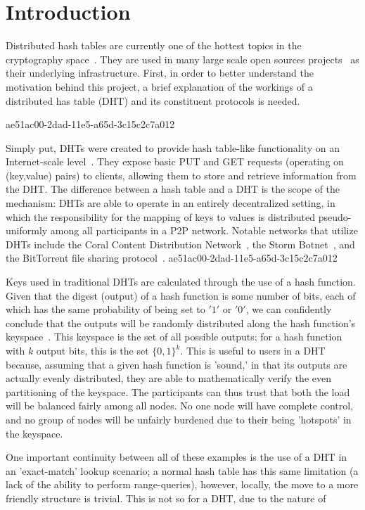 \documentclass[12pt]{article}
\begin{document}
\section{Introduction}
\par Distributed hash tables are currently one of the hottest topics in the cryptography space~\cite{Stoica:2001dj,Rowstron:2001ea,Ratnasamy:2001wn}. They are used in many large scale open sources projects~\cite{Freitas:2013tb,Xu:2010vs,Perfitt:2010fh} as their underlying infrastructure. First, in order to better understand the motivation behind this project, a brief explanation of the workings of a distributed has table (DHT) and its constituent protocols is needed.

ae51ac00-2dad-11e5-a65d-3c15c2c7a012\par Simply put, DHTs were created to provide hash table-like functionality on an Internet-scale level~\cite{Ratnasamy:2001wn}. They expose basic PUT and GET requests (operating on (key,value) pairs) to clients, allowing them to store and retrieve information from the DHT. The difference between a hash table and a DHT is the scope of the mechanism: DHTs are able to operate in an entirely decentralized setting, in which the responsibility for the mapping of keys to values is distributed pseudo-uniformly among all participants in a P2P network. Notable networks that utilize DHTs include the Coral Content Distribution Network~\cite{Freedman:2004vb}, the Storm Botnet~\cite{Holz:2008uk}, and the BitTorrent file sharing protocol~\cite{Cohen:y1_8mBnw}.
ae51ac00-2dad-11e5-a65d-3c15c2c7a012
\par Keys used in traditional DHTs are calculated through the use of a hash function. Given that the digest (output) of a hash function is some number of bits, each of which has the same probability of being set to $'1'$ or $'0'$, we can confidently conclude that the outputs will be randomly distributed along the hash function's keyspace~. This keyspace is the set of all possible outputs; for a hash function with $k$ output bits, this is the set $\{0,1\}^k$. This is useful to users in a DHT because, assuming that a given hash function is 'sound,' in that its outputs are actually evenly distributed, they are able to mathematically verify the even partitioning of the keyspace. The participants can thus trust that both the load will be balanced fairly among all nodes. No one node will have complete control, and no group of nodes will be unfairly burdened due to their being 'hotspots' in the keyspace.~

\par One important continuity between all of these examples is the use of a DHT in an 'exact-match' lookup scenario; a normal hash table has this same limitation (a lack of the ability to perform range-queries), however, locally, the move to a more friendly structure is trivial. This is not so for a DHT, due to the nature of
\printbibliography
\end{document}
